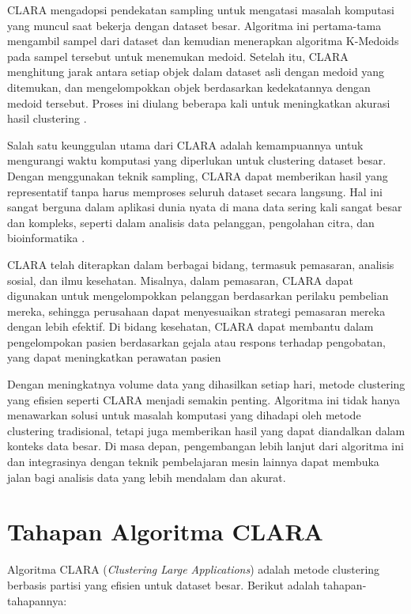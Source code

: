 \documentclass[
  oneside]{book}
\begin{document}
CLARA mengadopsi pendekatan sampling untuk mengatasi masalah komputasi
yang muncul saat bekerja dengan dataset besar. Algoritma ini
pertama-tama mengambil sampel dari dataset dan kemudian menerapkan
algoritma K-Medoids pada sampel tersebut untuk menemukan medoid. Setelah
itu, CLARA menghitung jarak antara setiap objek dalam dataset asli
dengan medoid yang ditemukan, dan mengelompokkan objek berdasarkan
kedekatannya dengan medoid tersebut. Proses ini diulang beberapa kali
untuk meningkatkan akurasi hasil clustering \citep{kaufman1990finding}.

Salah satu keunggulan utama dari CLARA adalah kemampuannya untuk
mengurangi waktu komputasi yang diperlukan untuk clustering dataset
besar. Dengan menggunakan teknik sampling, CLARA dapat memberikan hasil
yang representatif tanpa harus memproses seluruh dataset secara
langsung. Hal ini sangat berguna dalam aplikasi dunia nyata di mana data
sering kali sangat besar dan kompleks, seperti dalam analisis data
pelanggan, pengolahan citra, dan bioinformatika \citep{halkidi2001cluster}.

CLARA telah diterapkan dalam berbagai bidang, termasuk pemasaran,
analisis sosial, dan ilmu kesehatan. Misalnya, dalam pemasaran, CLARA
dapat digunakan untuk mengelompokkan pelanggan berdasarkan perilaku
pembelian mereka, sehingga perusahaan dapat menyesuaikan strategi
pemasaran mereka dengan lebih efektif. Di bidang kesehatan, CLARA dapat
membantu dalam pengelompokan pasien berdasarkan gejala atau respons
terhadap pengobatan, yang dapat meningkatkan perawatan pasien

Dengan meningkatnya volume data yang dihasilkan setiap hari, metode
clustering yang efisien seperti CLARA menjadi semakin penting. Algoritma
ini tidak hanya menawarkan solusi untuk masalah komputasi yang dihadapi
oleh metode clustering tradisional, tetapi juga memberikan hasil yang
dapat diandalkan dalam konteks data besar. Di masa depan, pengembangan
lebih lanjut dari algoritma ini dan integrasinya dengan teknik
pembelajaran mesin lainnya dapat membuka jalan bagi analisis data yang
lebih mendalam dan akurat.

\section{Tahapan Algoritma CLARA}\label{tahapan-algoritma-clara}

Algoritma CLARA (\emph{Clustering Large Applications}) adalah metode clustering berbasis partisi yang efisien untuk dataset besar. Berikut adalah tahapan-tahapannya:
\end{document}
